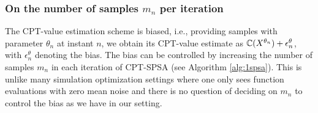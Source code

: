 
\subsubsection*{On the number of samples $m_n$ per iteration}
The CPT-value estimation scheme is biased, i.e., providing samples with parameter $\theta_n$ at instant $n$, we obtain its CPT-value estimate as $\mathbb{C}(X^{\theta_n}) + \epsilon_n^\theta$, with $\epsilon_n^\theta$ denoting the bias. The bias can be controlled by increasing the number of samples $m_n$ in each iteration of CPT-SPSA (see Algorithm \ref{alg:1spsa}). This is unlike many simulation optimization settings where one only sees function evaluations with zero mean noise and there is no question of deciding on $m_n$ to control the bias as we have in our setting.

